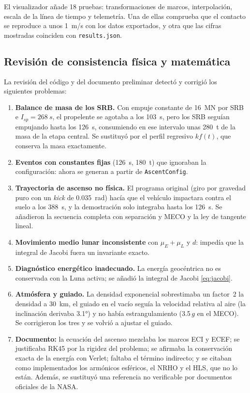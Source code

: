 \documentclass[11pt,a4paper]{article}
\begin{document}
El visualizador añade 18 pruebas: transformaciones de marcos, interpolación, escala de la línea de tiempo y telemetría. Una de ellas comprueba que el contacto se reproduce a unos \SI{1}{m/s} con los datos exportados, y otra que las cifras mostradas coinciden con \texttt{results.json}.
\subsection{Revisión de consistencia física y matemática}\label{sec:revision}
La revisión del código y del documento preliminar detectó y corrigió los siguientes problemas:
\begin{enumerate}
  \item \textbf{Balance de masa de los SRB.} Con empuje constante de \SI{16}{MN} por SRB e $I_{sp}=\SI{268}{s}$, el propelente se agotaba a los \SI{103}{s}, pero los SRB seguían empujando hasta los \SI{126}{s}, consumiendo en ese intervalo unas \SI{280}{t} de la masa de la etapa central. Se sustituyó por el perfil regresivo $k f(t)$, que conserva la masa exactamente.
  \item \textbf{Eventos con constantes fijas} (\SI{126}{s}, \SI{180}{t}) que ignoraban la configuración: ahora se generan a partir de \texttt{AscentConfig}.
  \item \textbf{Trayectoria de ascenso no física.} El programa original (giro por gravedad puro con un \emph{kick} de \SI{0.035}{rad}) hacía que el vehículo impactara contra el suelo a los \SI{388}{s}, y la demostración solo integraba hasta los \SI{126}{s}. Se añadieron la secuencia completa con separación y MECO y la ley de tangente lineal.
  \item \textbf{Movimiento medio lunar inconsistente} con $\mu_E+\mu_L$ y $d$: impedía que la integral de Jacobi fuera un invariante exacto.
  \item \textbf{Diagnóstico energético inadecuado.} La energía geocéntrica no es conservada con la Luna activa; se añadió la integral de Jacobi \eqref{eq:jacobi}.
  \item \textbf{Atmósfera y guiado.} La densidad exponencial sobrestimaba un factor~2 la densidad a \SI{30}{km}, el guiado en el vacío seguía la velocidad relativa al aire (la inclinación derivaba \ang{3.1}) y no había estrangulamiento (\num{3.5}\,$g$ en el MECO). Se corrigieron los tres y se volvió a ajustar el guiado.
  \item \textbf{Documento:} la ecuación del ascenso mezclaba los marcos ECI y ECEF; se justificaba RK45 por la rigidez del problema; se afirmaba la conservación exacta de la energía con Verlet; faltaba el término indirecto; y se citaban como implementados los armónicos esféricos, el NRHO y el HLS, que no lo están. Además, se sustituyó una referencia no verificable por documentos oficiales de la NASA.

\end{enumerate}
\end{document}
